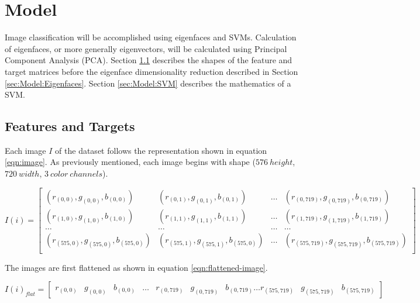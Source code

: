\documentclass[journal]{new-aiaa}
\begin{document}
\section{Model}\label{sec:Model}
Image classification will be accomplished using eigenfaces and SVMs.
Calculation of eigenfaces, or more generally eigenvectors, will be calculated using Principal Component Analysis (PCA).
Section \ref{sec:Model:Features and Targets} describes the shapes of the feature and target matrices before the eigenface dimensionality reduction described in Section \ref{sec:Model:Eigenfaces}.
Section \ref{sec:Model:SVM} describes the mathematics of a SVM.

\subsection{Features and Targets}\label{sec:Model:Features and Targets}
Each image $I$ of the dataset follows the representation shown in equation \ref{eqn:image}.
As previously mentioned, each image begins with shape ($576\ height$, $720\ width$, $3\ color\ channels$).

\begin{equation}\label{eqn:image}
  I(i)=\begin{bmatrix} (r_{(0,0)}, g_{(0,0)}, b_{(0,0)}) & (r_{(0,1)}, g_{(0,1)}, b_{(0,1)}) & \dots & (r_{(0,719)}, g_{(0,719)}, b_{(0,719)}) \\
    (r_{(1,0)}, g_{(1,0)}, b_{(1,0)}) & (r_{(1,1)}, g_{(1,1)}, b_{(1,1)}) & \dots & (r_{(1,719)}, g_{(1,719)}, b_{(1,719)}) \\
    \dots & \dots & \dots & \dots \\
    (r_{(575,0)}, g_{(575,0)}, b_{(575,0)}) & (r_{(575,1)}, g_{(575,1)}, b_{(575,0)}) & \dots & (r_{(575,719)}, g_{(575,719)}, b_{(575,719)}) \\
  \end{bmatrix}
\end{equation}

The images are first flattened as shown in equation \ref{eqn:flattened-image}.

\begin{equation}\label{eqn:flattened-image}
  I(i)_{flat}=
  \begin{bmatrix} r_{(0,0)} & g_{(0,0)} & b_{(0,0)} & \dots & r_{(0,719)} & g_{(0,719)} & b_{(0,719)} \dots r_{(575,719)} & g_{(575,719)} & b_{(575,719)}
  \end{bmatrix}
\end{equation}
\end{document}
